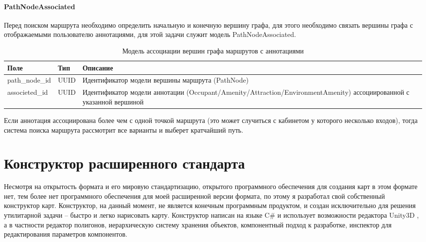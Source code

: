         \paragraph{PathNodeAssociated}
          Перед поиском маршрута необходимо определить начальную и конечную вершину графа, для этого необходимо связать вершины графа с отображаемыми пользователю аннотациями, для этой задачи служит модель PathNodeAssociated.
          \begin{center}
            \begin{xltabular}{\linewidth}{|l|p{4cm}|X|}
              \caption{Модель ассоциации вершин графа маршрутов с аннотациями}\\\hline
              Поле            & Тип  & Описание                                                                                                             \\ \hline
              path\_node\_id  & UUID & Идентификатор модели вершины маршрута (PathNode)                                                                     \\ \hline
              associeted\_id  & UUID & Идентификатор модели аннотации (Occupant/Amenity/Attraction/EnvironmentAmenity) ассоциированной с указанной вершиной \\ \hline
            \end{xltabular}
          \end{center}


          Если аннотация ассоциирована более чем с одной точкой маршрута (это может случиться с кабинетом у которого несколько входов), тогда система поиска маршрута рассмотрит все варианты и выберет кратчайший путь.

  \section{Конструктор расширенного стандарта}
    Несмотря на открытость формата и его мировую стандартизацию, открытого программного обеспечения для создания карт в этом формате нет, тем более нет программного обеспечения для моей расширенной версии формата, по этому я разработал свой собственный конструктор карт. Конструктор, на данный момент, не является конечным программным продуктом, и создан исключительно для решения утилитарной задачи -- быстро и легко нарисовать карту. Конструктор написан на языке C\# и использует возможности редактора Unity3D \cite{Unity3D}, а в частности редактор полигонов, иерархическую систему хранения объектов, компонентный подход к разработке, инспектор для редактирования параметров компонентов.


